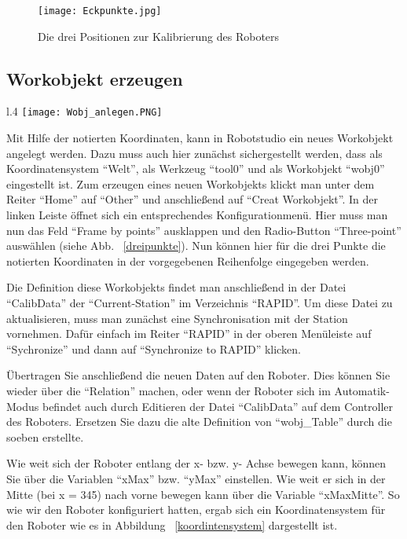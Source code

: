 \begin{figure}[htbp]
\centering
\texttt{[image: Eckpunkte.jpg]}
\caption{Die drei Positionen zur Kalibrierung des Roboters} 
\label{eckpunkte}
\end{figure}

\subsection{Workobjekt erzeugen}

\begin{wrapfigure}{l}{.4\textwidth}
\centering
\texttt{[image: Wobj\_anlegen.PNG]}
\vspace{-15pt}
\caption{Workobjekt über drei Punkte definieren} 
\label{dreipunkte}
\end{wrapfigure}

Mit Hilfe der notierten Koordinaten, kann in Robotstudio ein neues Workobjekt angelegt werden. Dazu muss auch hier zunächst sichergestellt werden, dass als Koordinatensystem \enquote{Welt}, als Werkzeug \enquote{tool0} und als Workobjekt \enquote{wobj0} eingestellt ist. Zum erzeugen eines neuen Workobjekts klickt man unter dem Reiter \enquote{Home} auf \enquote{Other} und anschließend auf \enquote{Creat Workobjekt}. In der linken Leiste öffnet sich ein entsprechendes Konfigurationmenü. Hier muss man nun das Feld \enquote{Frame by points} ausklappen und den Radio-Button \enquote{Three-point} auswählen (siehe Abb. ~\ref{dreipunkte}). Nun können hier für die drei Punkte die notierten Koordinaten  in der vorgegebenen Reihenfolge eingegeben werden.  

Die Definition diese Workobjekts findet man anschließend in der Datei \enquote{CalibData} der \enquote{Current-Station} im Verzeichnis \enquote{RAPID}. Um diese Datei zu aktualisieren, muss man zunächst eine Synchronisation mit der Station vornehmen. Dafür einfach im Reiter \enquote{RAPID} in der oberen Menüleiste auf \enquote{Sychronize} und dann auf \enquote{Synchronize to RAPID} klicken. 

Übertragen Sie anschließend die neuen Daten auf den Roboter. Dies können Sie wieder über die \enquote{Relation} machen, oder wenn der Roboter sich im Automatik-Modus befindet auch durch Editieren der Datei \enquote{CalibData} auf dem Controller des Roboters. 
Ersetzen Sie dazu die alte Definition von \enquote{wobj\_Table} durch die soeben erstellte. 

Wie weit sich der Roboter entlang der x- bzw. y- Achse bewegen kann, können Sie über die Variablen \enquote{xMax} bzw. \enquote{yMax} einstellen. Wie weit er sich in der Mitte (bei x = 345) nach vorne bewegen kann über die Variable \enquote{xMaxMitte}. So wie wir den Roboter konfiguriert hatten, ergab sich ein Koordinatensystem für den Roboter wie es in Abbildung ~\ref{koordintensystem} dargestellt ist. 

